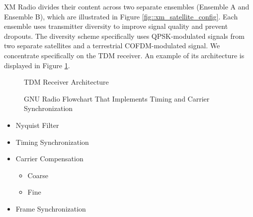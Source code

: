 \documentclass[conference,onecolumn]{IEEEtran}
\begin{document}
XM Radio divides their content across two separate ensembles (Ensemble A and Ensemble B), which are illustrated in Figure \ref{fig::xm_satellite_config}. Each ensemble uses transmitter diversity to improve signal quality and prevent dropouts. The diversity scheme specifically uses QPSK-modulated signals from two separate satellites and a terrestrial COFDM-modulated signal. We concentrate specifically on the TDM receiver. An example of its architecture is displayed in Figure \ref{fig::tdm_receiver}. 

\begin{figure}[H]
	\centerline{}
	\caption{TDM Receiver Architecture \cite{a2008_us8260192b2}}
	\label{fig::tdm_receiver}
\end{figure}


\begin{figure}[H]
	\centerline{}
	\caption{GNU Radio Flowchart That Implements Timing and Carrier Synchronization}
	\label{fig::timing_carrier_sync}
\end{figure}

\begin{itemize}
	\item Nyquist Filter
	\item Timing Synchronization
	\item Carrier Compensation
	\begin{itemize}
		\item Coarse
		\item Fine
	\end{itemize}
	\item Frame Synchronization
\end{itemize}

\nocite{5586866}
\nocite{a2008_us8260192b2}
\nocite{marko_2012_us8667344b2}
\nocite{collins_2018_softwaredefined}
\nocite{chaudhari_2022_timing}
\nocite{650240}

{}
%
\end{document}

